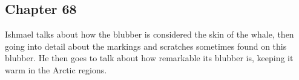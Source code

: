 \subsection{Chapter 68}

Ishmael talks about how the blubber is considered the skin of the whale, then
going into detail about the markings and scratches sometimes found on this
blubber. He then goes to talk about how remarkable its blubber is, keeping it
warm in the Arctic regions.
